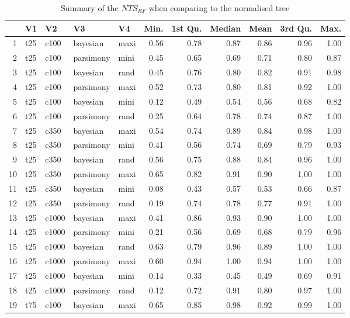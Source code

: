 \documentclass[12pt,letterpaper]{article}
\begin{document}
\begin{longtable}{rllllrrrrrr}
\caption{Summary of the $NTS_{RF}$ when comparing to the normalised tree}\\

  \hline
 & V1 & V2 & V3 & V4 & Min. & 1st Qu. & Median & Mean & 3rd Qu. & Max. \\ 
  \hline
1 & t25 & c100 & bayesian & maxi & 0.56 & 0.78 & 0.87 & 0.86 & 0.96 & 1.00 \\ 
  2 & t25 & c100 & parsimony & mini & 0.45 & 0.65 & 0.69 & 0.71 & 0.80 & 0.87 \\ 
  3 & t25 & c100 & bayesian & rand & 0.45 & 0.76 & 0.80 & 0.82 & 0.91 & 0.98 \\ 
  4 & t25 & c100 & parsimony & maxi & 0.52 & 0.73 & 0.80 & 0.81 & 0.92 & 1.00 \\ 
  5 & t25 & c100 & bayesian & mini & 0.12 & 0.49 & 0.54 & 0.56 & 0.68 & 0.82 \\ 
  6 & t25 & c100 & parsimony & rand & 0.25 & 0.64 & 0.78 & 0.74 & 0.87 & 1.00 \\ 
  7 & t25 & c350 & bayesian & maxi & 0.54 & 0.74 & 0.89 & 0.84 & 0.98 & 1.00 \\ 
  8 & t25 & c350 & parsimony & mini & 0.41 & 0.56 & 0.74 & 0.69 & 0.79 & 0.93 \\ 
  9 & t25 & c350 & bayesian & rand & 0.56 & 0.75 & 0.88 & 0.84 & 0.96 & 1.00 \\ 
  10 & t25 & c350 & parsimony & maxi & 0.65 & 0.82 & 0.91 & 0.90 & 1.00 & 1.00 \\ 
  11 & t25 & c350 & bayesian & mini & 0.08 & 0.43 & 0.57 & 0.53 & 0.66 & 0.87 \\ 
  12 & t25 & c350 & parsimony & rand & 0.19 & 0.74 & 0.78 & 0.77 & 0.91 & 1.00 \\ 
  13 & t25 & c1000 & bayesian & maxi & 0.41 & 0.86 & 0.93 & 0.90 & 1.00 & 1.00 \\ 
  14 & t25 & c1000 & parsimony & mini & 0.21 & 0.56 & 0.69 & 0.68 & 0.79 & 0.96 \\ 
  15 & t25 & c1000 & bayesian & rand & 0.63 & 0.79 & 0.96 & 0.89 & 1.00 & 1.00 \\ 
  16 & t25 & c1000 & parsimony & maxi & 0.60 & 0.94 & 1.00 & 0.94 & 1.00 & 1.00 \\ 
  17 & t25 & c1000 & bayesian & mini & 0.14 & 0.33 & 0.45 & 0.49 & 0.69 & 0.91 \\ 
  18 & t25 & c1000 & parsimony & rand & 0.12 & 0.72 & 0.91 & 0.80 & 0.97 & 1.00 \\ 
  19 & t75 & c100 & bayesian & maxi & 0.65 & 0.85 & 0.98 & 0.92 & 0.99 & 1.00 \\ 

\end{longtable}
\end{document}
